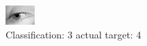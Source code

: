 \begin{figure}[h!]
\begin{center}
\includegraphics[width=0.60\columnwidth]{figures/ID3043_class_3_target_4.png}
\end{center}
\caption{ Classification: 3 actual target: 4}
\label{fig:ID3043_class_3_target_4}
\end{figure}
